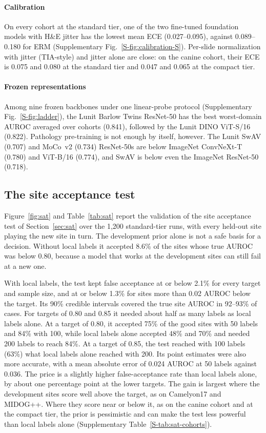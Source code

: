 \paragraph{Calibration} On every cohort at the standard tier, one of the two
fine-tuned foundation models with H\&E jitter has the lowest mean ECE
(0.027--0.095), against
0.089--0.180 for ERM (Supplementary Fig.~\ref{S-fig:calibration-S}). Per-slide
normalization with jitter (TIA-style) and jitter alone are close: on the
canine cohort, their ECE is 0.075 and 0.080 at the standard tier and 0.047 and
0.065 at the compact tier.

\paragraph{Frozen representations} Among nine frozen backbones under one
linear-probe protocol (Supplementary Fig.~\ref{S-fig:ladder}), the Lunit Barlow Twins
ResNet-50 has the best worst-domain AUROC averaged over cohorts (0.841),
followed by the Lunit DINO ViT-S/16 (0.822). Pathology pre-training is not
enough by itself, however. The Lunit SwAV (0.707) and MoCo~v2 (0.734)
ResNet-50s are below ImageNet ConvNeXt-T (0.780) and ViT-B/16 (0.774), and
SwAV is below even the ImageNet ResNet-50 (0.718).

\subsection{The site acceptance test}
\label{sec:results-sat}

Figure~\ref{fig:sat} and Table~\ref{tab:sat} report the validation of the
site acceptance test of Section~\ref{sec:sat} over the 1,200 standard-tier
runs, with every held-out site playing the new site in turn. The development
prior alone is not a safe basis for a decision. Without local labels it
accepted 8.6\% of the sites whose true AUROC was below 0.80, because a model
that works at the development sites can still fail at a new one.

With local labels, the test kept false acceptance at or below 2.1\% for every
target and sample size, and at or below 1.3\% for sites more than 0.02 AUROC
below the target. Its 90\% credible intervals covered the true site AUROC in
92--93\% of cases. For targets of 0.80 and 0.85 it needed about half as many labels as local
labels alone. At a target of 0.80, it accepted 75\% of the good sites with 50 labels and 84\% with
100, while local labels alone accepted 48\% and 70\% and needed 200 labels to
reach 84\%. At a target of 0.85, the test reached with 100 labels (63\%) what
local labels alone reached with 200. Its point estimates were also more
accurate, with a mean absolute error of 0.024 AUROC at 50 labels against 0.036.
The price is a slightly higher false-acceptance rate than local labels alone,
by about one percentage point at the lower targets. The gain is largest where
the development sites score well above the target, as on Camelyon17 and
MIDOG++. Where they score near or below it, as on the canine cohort and at the
compact tier, the prior is pessimistic and can make the test less powerful
than local labels alone (Supplementary Table~\ref{S-tab:sat-cohorts}).

